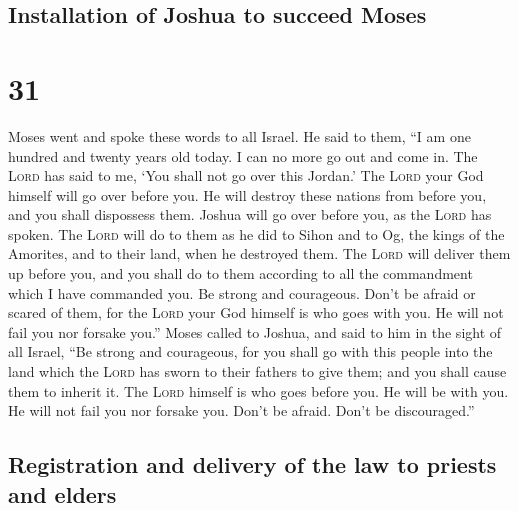 \hypertarget{installation-of-joshua-to-succeed-moses}{%
\subsection{Installation of Joshua to succeed
Moses}\label{installation-of-joshua-to-succeed-moses}}

\hypertarget{section-30}{%
\section{31}\label{section-30}}

 Moses went and spoke these words to all Israel.
 He said to them, ``I am one hundred and twenty years old
today. I can no more go out and come in. The \textsc{Lord} has said to
me, `You shall not go over this Jordan.'  The
\textsc{Lord} your God himself will go over before you. He will destroy
these nations from before you, and you shall dispossess them. Joshua
will go over before you, as the \textsc{Lord} has spoken. 
The \textsc{Lord} will do to them as he did to Sihon and to Og, the
kings of the Amorites, and to their land, when he destroyed them.
 The \textsc{Lord} will deliver them up before you, and
you shall do to them according to all the commandment which I have
commanded you.  Be strong and courageous. Don't be afraid
or scared of them, for the \textsc{Lord} your God himself is who goes
with you. He will not fail you nor forsake you.''  Moses
called to Joshua, and said to him in the sight of all Israel, ``Be
strong and courageous, for you shall go with this people into the land
which the \textsc{Lord} has sworn to their fathers to give them; and you
shall cause them to inherit it.  The \textsc{Lord} himself
is who goes before you. He will be with you. He will not fail you nor
forsake you. Don't be afraid. Don't be discouraged.''

\hypertarget{registration-and-delivery-of-the-law-to-priests-and-elders}{%
\subsection{Registration and delivery of the law to priests and
elders}\label{registration-and-delivery-of-the-law-to-priests-and-elders}}

